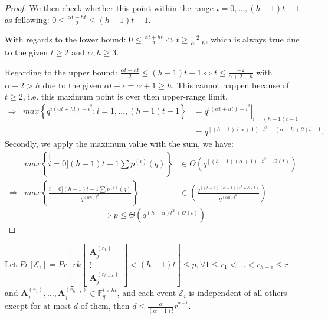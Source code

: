 \begin{proof}
We then check whether this point within the range $i=0,\ldots,(h-1)t-1$
as following: $0\leq\frac{\alpha t+ht}{2}\leq(h-1)t-1$.

With regards to the lower bound: $0\leq\frac{\alpha t+ht}{2}\Leftrightarrow t\geq\frac{2}{\alpha+h}$,
which is always true due to the given $t\geq2$ and $\alpha,h\geq3$.

Regarding to the upper bound: $\frac{\alpha t+ht}{2}\leq(h-1)t-1\Leftrightarrow t\leq\frac{-2}{\alpha+2-h}$
with $\alpha+2>h$ due to the given $\alpha l+\epsilon=\alpha+1\geq h$.
This cannot happen because of $t\geq2$, i.e. this maximum point is
over then upper-range limit.
\begin{eqnarray*}
\Rightarrow & max\left\{ q^{i(\alpha t+ht)-i^{2}}:i=1,\ldots,(h-1)t-1\right\}  & =\left.q^{i(\alpha t+ht)-i^{2}}\right|_{i=(h-1)t-1}\\
 &  & =q^{\left[\left(h-1\right)\left(\alpha+1\right)\right]t^{2}-\left(\alpha-h+2\right)t-1}.
\end{eqnarray*}
Secondly, we apply the maximum value with the sum, we have:
\begin{eqnarray*}
 & max\left\{ \stackrel[i=0]{(h-1)t-1}{\mathop{\sum}}p^{(i)}(q)\right\}  & \in\Theta\left(q^{\left[\left(h-1\right)\left(\alpha+1\right)\right]t^{2}+\mathcal{O}(t)}\right)\\
\Rightarrow & max\left\{ \frac{\stackrel[i=0]{(h-1)t-1}{\mathop{\sum}}p^{(i)}(q)}{q^{\left(\alpha h\right)t^{2}}}\right\}  & \in\left(\frac{q^{\left[\left(h-1\right)\left(\alpha+1\right)\right]t^{2}+\mathcal{O}(t)}}{q^{\left(\alpha h\right)t^{2}}}\right)
\end{eqnarray*}
\[
\Rightarrow p\leq\Theta\left(q^{\left(h-\alpha\right)t^{2}+\mathcal{O}(t)}\right)
\]
\end{proof}
\begin{lem}
Let $Pr\left[\mathcal{E}_{i}\right]=Pr\left[rk\left[\begin{array}{c}
\boldsymbol{A}_{j}^{\left(r_{1}\right)}\\
\vdots\\
\boldsymbol{A}_{j}^{\left(r_{h-\epsilon}\right)}
\end{array}\right]<(h-1)t\right]\leq p,\forall1\leq r_{1}<\ldots<r_{h-\epsilon}\leq r$ and $\boldsymbol{A}_{j}^{\left(r_{1}\right)},\ldots,\boldsymbol{A}_{j}^{\left(r_{h-\epsilon}\right)}\in\ensuremath{\mathbb{F}}_{q}^{t\times ht}$,
and each event $\mathcal{E}_{i}$ is independent of all others except
for at most $d$ of them, then $d\leq\frac{\alpha}{\left(\alpha-1\right)!}r^{^{\alpha-1}}$\label{lem:d_e1l1}.
\end{lem}
